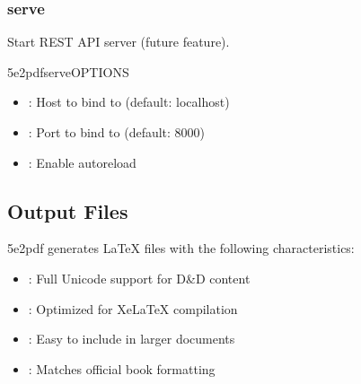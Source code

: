 \documentclass[letterpaper,10pt,english]{sphinxmanual}
\begin{document}
\subsubsection{serve}
\label{\detokenize{user-guide/cli-reference:serve}}
\sphinxAtStartPar
Start REST API server (future feature).

\begin{sphinxVerbatim}[commandchars=\\\{\}]
5e2pdfserve\PYG{o}{[}OPTIONS\PYG{o}{]}
\end{sphinxVerbatim}

\sphinxAtStartPar
{}
\begin{itemize}
\item {} 
\sphinxAtStartPar
{}: Host to bind to (default: localhost)

\item {} 
\sphinxAtStartPar
{}: Port to bind to (default: 8000)

\item {} 
\sphinxAtStartPar
{}: Enable auto\sphinxhyphen{}reload

\end{itemize}


\subsection{Output Files}
\label{\detokenize{user-guide/cli-reference:output-files}}
\sphinxAtStartPar
5e2pdf generates LaTeX files with the following characteristics:
\begin{itemize}
\item {} 
\sphinxAtStartPar
{}: Full Unicode support for D\&D content

\item {} 
\sphinxAtStartPar
{}: Optimized for XeLaTeX compilation

\item {} 
\sphinxAtStartPar
{}: Easy to include in larger documents

\item {} 
\sphinxAtStartPar
{}: Matches official book formatting

\end{itemize}
\end{document}

